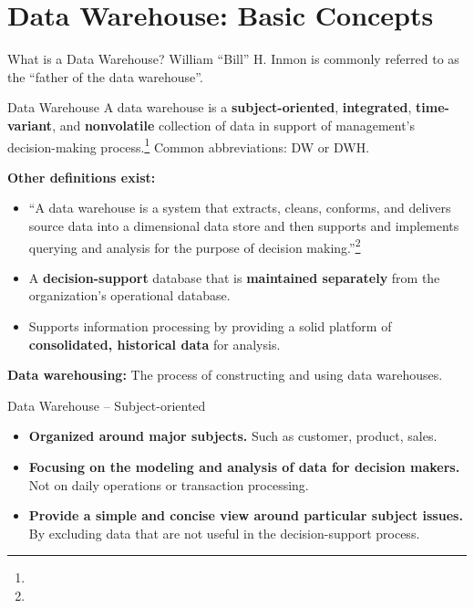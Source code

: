 \section{Data Warehouse: Basic Concepts}

\begin{frame}{What is a Data Warehouse?}
	William ``Bill'' H. Inmon is commonly referred to as the ``father of the data warehouse''.
	\begin{block}{Data Warehouse}
		A data warehouse is a \textbf{subject-oriented}, \textbf{integrated}, \textbf{time-variant}, and \textbf{nonvolatile} collection of data in support of management's decision-making process.\footnote{} Common abbreviations: DW or DWH.
	\end{block}

	\small
	\textbf{Other definitions exist:}
	\begin{itemize}
		\item ``A data warehouse is a system that extracts, cleans, conforms, and delivers source data into a dimensional data store and then supports and implements querying and analysis for the purpose of decision making.''\footnote{}
		\item A \textbf{\color{airforceblue}decision-support} database that is
		      \textbf{\color{airforceblue}maintained separately} from the organization's
		      operational database.
		\item Supports information processing by providing a solid platform of
		      \textbf{\color{airforceblue}consolidated, historical data} for analysis.
	\end{itemize}

	\textbf{\color{airforceblue}Data warehousing:} The process of constructing and using data warehouses.
\end{frame}

\begin{frame}{Data Warehouse -- Subject-oriented}
	\begin{itemize}
		\item \textbf{Organized around major subjects.} Such as customer, product,
		      sales.
		\item \textbf{Focusing on the modeling and analysis of data for
				      {\color{airforceblue}decision makers}.} Not on daily operations or
		      transaction processing.
		\item \textbf{Provide a simple and concise view around particular
			      subject issues.} By excluding data that are not useful in the
		      decision-support process.
	\end{itemize}
\end{frame}

